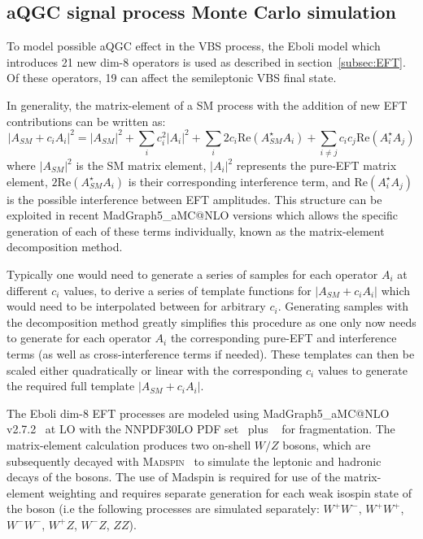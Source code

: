 \subsection{aQGC signal process Monte Carlo simulation}
To model possible aQGC effect in the VBS process, the Eboli model \cite{eboli2006p} which introduces 21 new dim-8 operators is used as described in section~\ref{subsec:EFT}.
Of these operators, 19 can affect the semileptonic VBS final state.

In generality, the matrix-element of a SM process with the addition of new EFT contributions can be written as:
\begin{equation}
  |A_{SM}+c_iA_i|^2 = |A_{SM}|^2+\sum\limits_i c_i^2|A_{i}|^2+ \sum\limits_i 2 c_i \mathrm{Re}(A_{SM}^\star A_i) +\sum\limits_{i\neq j} c_i c_j \mathrm{Re}(A_i^\star A_j)
\end{equation}
where $|A_{SM}|^2$ is the SM matrix element, $|A_{i}|^2$ represents the pure-EFT matrix element, $2 \mathrm{Re}(A_{SM}^\star A_i)$ is their corresponding interference term, and $\mathrm{Re}(A_i^\star A_j)$ is the possible interference between EFT amplitudes.
This structure can be exploited in recent MadGraph5\_aMC@NLO versions which allows the specific generation of each of these terms individually, known as the matrix-element decomposition method.

Typically one would need to generate a series of samples for each operator $A_i$ at different $c_i$ values, to derive a series of template functions for $|A_{SM}+c_iA_i|$ which would need to be interpolated between for arbitrary $c_i$. Generating samples with the decomposition method greatly simplifies this procedure as one only now needs to generate for each operator $A_i$ the corresponding pure-EFT and interference terms (as well as cross-interference terms if needed). These templates can then be scaled either quadratically or linear with the corresponding $c_i$ values to generate the required full template $|A_{SM}+c_iA_i|$.

The Eboli dim-8 EFT processes are modeled using MadGraph5\_aMC@NLO v2.7.2~\cite{Alwall:2014hca} at LO with the \textsc{NNPDF30LO} PDF set~\cite{Ball:2012cx} plus ~\cite{Sjostrand:2007gs} for fragmentation.
The matrix-element calculation produces two on-shell $W/Z$ bosons, which are subsequently decayed with \textsc{Madspin}~\cite{Artoisenet:2012st} to simulate the leptonic and hadronic decays of the bosons.
The use of Madspin is required for use of the matrix-element weighting and requires separate generation for each weak isospin state of the boson (i.e the following processes are simulated separately: $W^+W^-$, $W^+W^+$, $W^-W^-$, $W^+Z$, $W^-Z$, $ZZ$). \\ \\


